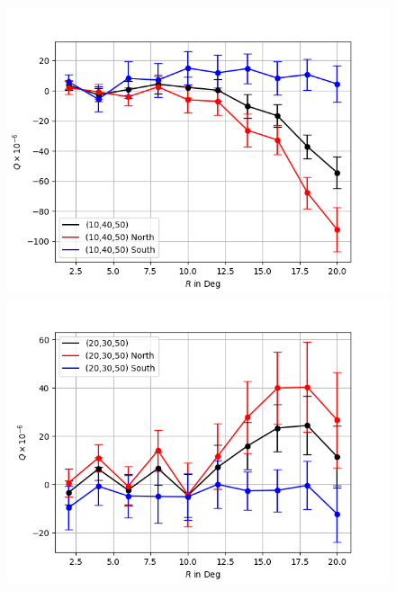 \documentclass[english]{article}
\begin{document}
\begin{figure}
	\includegraphics[scale=0.5]{Qhemisphere_wk_100_400_10_40_50_scrubbed.png}\includegraphics[scale=0.5]{Qhemisphere_wk_100_400_20_30_50_scrubbed.png}
	

\end{figure}
\end{document}
